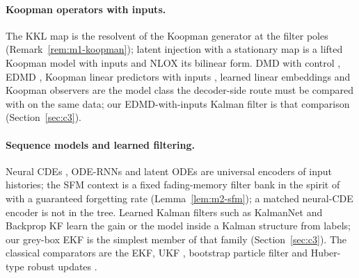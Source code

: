 \paragraph{Koopman operators with inputs.} The KKL map is the resolvent of the Koopman generator at the filter poles (Remark~\ref{rem:m1-koopman}); latent injection with a stationary map is a lifted Koopman model with inputs and NLOX its bilinear form. DMD with control \citep{proctor2016dmdc}, EDMD \citep{williams2015edmd}, Koopman linear predictors with inputs \citep{korda2018linear}, learned linear embeddings \citep{lusch2018deep} and Koopman observers \citep{surana2016koopman} are the model class the decoder-side route must be compared with on the same data; our EDMD-with-inputs Kalman filter is that comparison (Section~\ref{sec:c3}).

\paragraph{Sequence models and learned filtering.} Neural CDEs \citep{kidger2020neuralcde}, ODE-RNNs and latent ODEs \citep{rubanova2019latentode,chen2018neuralode} are universal encoders of input histories; the SFM context is a fixed fading-memory filter bank in the spirit of \citet{boyd1985fading} with a guaranteed forgetting rate (Lemma~\ref{lem:m2-sfm}); a matched neural-CDE encoder is not in the tree. Learned Kalman filters such as KalmanNet \citep{revach2022kalmannet} and Backprop KF \citep{haarnoja2016backpropkf} learn the gain or the model inside a Kalman structure from labels; our grey-box EKF is the simplest member of that family (Section~\ref{sec:c3}). The classical comparators are the EKF, UKF \citep{julier2004unscented}, bootstrap particle filter \citep{gordon1993novel} and Huber-type robust updates \citep{huber1964robust}.
